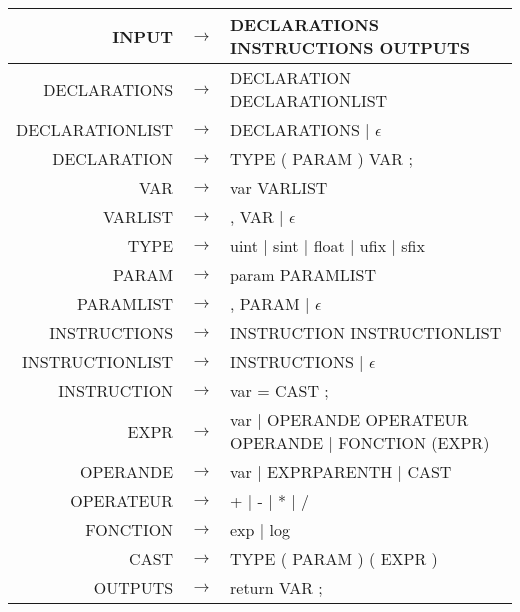 \documentclass{article}
\begin{document}
\begin{tabular}{rll}
\noindent INPUT & $\rightarrow$ & DECLARATIONS INSTRUCTIONS OUTPUTS\\
\hline
DECLARATIONS & $\rightarrow$ & DECLARATION DECLARATIONLIST\\
DECLARATIONLIST & $\rightarrow$ & DECLARATIONS | $\epsilon$\\
DECLARATION & $\rightarrow$ & TYPE ( PARAM ) VAR ;\\
VAR & $\rightarrow$ & var VARLIST\\
VARLIST & $\rightarrow$ & , VAR | $\epsilon$\\
TYPE & $\rightarrow$ & uint | sint | float | ufix | sfix\\
PARAM & $\rightarrow$ & param PARAMLIST\\
PARAMLIST & $\rightarrow$ & , PARAM | $\epsilon$\\
\hline
INSTRUCTIONS & $\rightarrow$ & INSTRUCTION INSTRUCTIONLIST\\
INSTRUCTIONLIST & $\rightarrow$ & INSTRUCTIONS | $\epsilon$\\
INSTRUCTION & $\rightarrow$ & var = CAST ;\\
EXPR & $\rightarrow$ & var | OPERANDE OPERATEUR OPERANDE | FONCTION (EXPR)\\
OPERANDE & $\rightarrow$ & var | EXPRPARENTH | CAST\\
OPERATEUR & $\rightarrow$ & + | - | * | /\\
FONCTION & $\rightarrow$ & exp | log\\
CAST & $\rightarrow$ & TYPE ( PARAM ) ( EXPR )\\
\hline
OUTPUTS & $\rightarrow$ & return VAR ;\\
\end{tabular}
\end{document}
